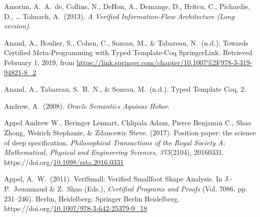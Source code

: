 \documentclass[12pt,twoside]{article}
\begin{document}
{\begin{thebibliography}{222}
\mdbibitemlabel{}Amorim, A.~A.~de, Collins, N., DeHon, A., Demange, D., Hritcu, C., Pichardie, D., … Tolmach, A.~(2013). \emph{A Verified Information-Flow Architecture (Long version)}.\label{amorim_verified_2013}%

\mdbibitemlabel{}Anand, A., Boulier, S., Cohen, C., Sozeau, M., \& Tabareau, N.~(n.d.). Towards Certified Meta-Programming with Typed Template-Coq \textbar{} SpringerLink. Retrieved February 1, 2019, from \href{https://link.springer.com/chapter/10.1007\%252F978-3-319-94821-8_2}{{\ttfamily https://\hspace{0pt}link.\hspace{0pt}springer.\hspace{0pt}com/\hspace{0pt}chapter/\hspace{0pt}10.\hspace{0pt}1007\hspace{0pt}\%2F978-\hspace{0pt}3-\hspace{0pt}319-\hspace{0pt}94821-\hspace{0pt}8\_\hspace{0pt}2}}\label{anand_towards_nodate}%

\mdbibitemlabel{}Anand, A., Tabareau, S.~B.~N., \& Sozeau, M.~(n.d.). Typed Template Coq, 2.\label{anand_typed_nodate}%

\mdbibitemlabel{}Andrew, A.~(2008). \emph{Oracle Semantics Aquinas Hobor}.\label{andrew_oracle_2008}%

\mdbibitemlabel{}Appel Andrew W., Beringer Lennart, Chlipala Adam, Pierce Benjamin C., Shao Zhong, Weirich Stephanie, \& Zdancewic Steve. (2017). Position paper: the science of deep specification. \emph{Philosophical Transactions of the Royal Society A: Mathematical, Physical and Engineering Sciences}, \emph{375}(2104), 20160331. https://doi.org/\href{https://dx.doi.org/10.1098/rsta.2016.0331}{10.1098/rsta.2016.0331}\label{appel_andrew_w._position_2017}%

\mdbibitemlabel{}Appel, A.~W.~(2011). VeriSmall: Verified Smallfoot Shape Analysis. In J.-P.~Jouannaud \& Z.~Shao (Eds.), \emph{Certified Programs and Proofs} (Vol. 7086, pp. 231–246). Berlin, Heidelberg: Springer Berlin Heidelberg. https://doi.org/\href{https://dx.doi.org/10.1007/978-3-642-25379-9_18}{10.1007/978-3-642-25379-9\_18}\label{jouannaud_verismall:_2011}%


\end{thebibliography}}
\end{document}
